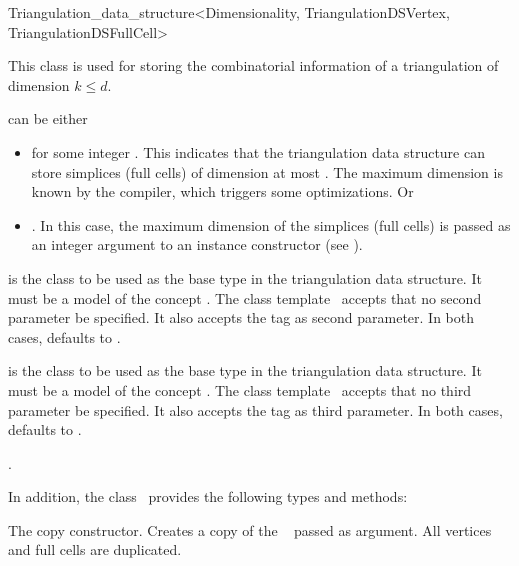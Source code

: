 \begin{ccRefClass}{Triangulation_data_structure<Dimensionality, TriangulationDSVertex, TriangulationDSFullCell>}

\ccDefinition 
This class is used for storing the combinatorial information of a triangulation
of dimension $k\leq d$.


\ccParameters

 can be either \begin{itemize}

\item \ccPureGlobalScope{} for some integer . This
indicates that the triangulation data structure can store simplices (full cells) of dimension at most
. The maximum dimension  is known by the compiler, which
triggers some optimizations. Or

\item \ccPureGlobalScope{}. In this case, the maximum
dimension of the simplices (full cells) is passed as an integer argument to an instance
constructor (see ).\end{itemize}

 is the class to be used as the base  type in the
triangulation data structure. It must be a model of the concept
. The class template \ccRefName\ accepts that no
second parameter be specified. It also accepts the tag  as
second parameter. In both cases,  defaults to
.


 is the class to be used as the base  type in
the triangulation data structure. It must be a model of the concept
. The class template \ccRefName\ accepts that no
third parameter be specified. It also accepts the tag  as
third parameter. In both cases,  defaults to
.

\ccIsModel

.

In addition, the class \ccRefName\ provides the following types and methods:

\ccCreation
{}

{The copy constructor. Creates a copy of the \ccRefName\  passed as
    argument. All vertices and full cells are duplicated.}


\end{ccRefClass}
